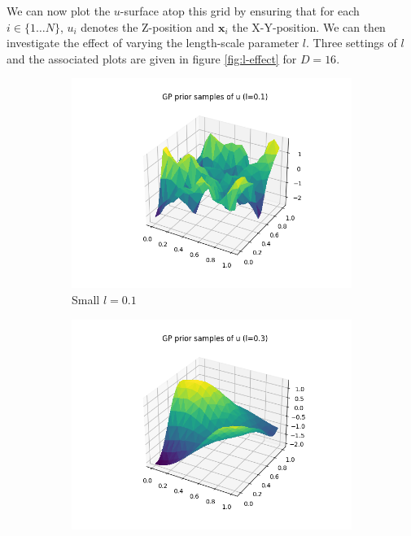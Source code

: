 \documentclass[]{article}
\newcommand{\xbold}{\boldsymbol{x}}
\begin{document}
We can now plot the $u$-surface atop this grid by ensuring that for each $i \in \{1 \dots N\}$, $u_i$ denotes the Z-position and $\xbold_i$ the X-Y-position. We can then investigate the effect of varying the length-scale parameter $l$. Three settings of $l$ and the associated plots are given in figure \ref{fig:l-effect} for $D=16$.
%
\begin{figure}[!h]
	\centering
	\begin{subfigure}{0.32\linewidth}
		\includegraphics[width=\linewidth]{u-small.png}
		\caption{Small $l=0.1$}
	\end{subfigure}
	\begin{subfigure}{0.32\linewidth}
		\includegraphics[width=\linewidth]{u-med.png}

\end{subfigure}
\end{figure}
\end{document}

